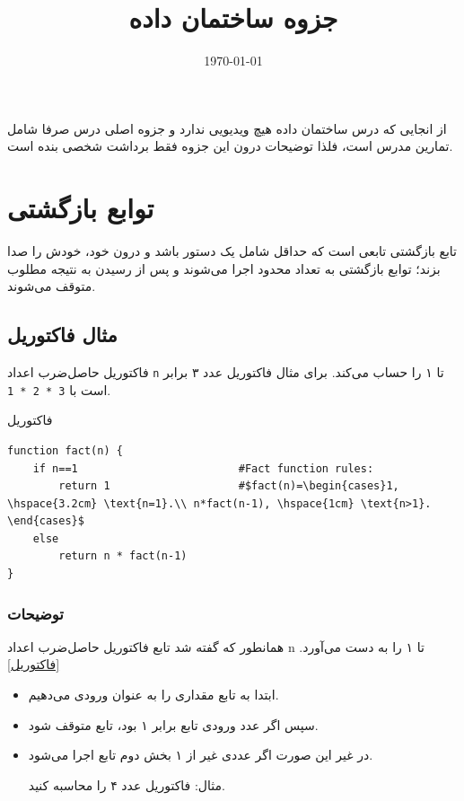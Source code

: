 \documentclass[a4paper]{article}
\author{\rl{مهدی صفریان}}
\date{\today}
\title{جزوه ساختمان داده}
\begin{document}
\maketitle
\tableofcontents

\begin{block}
از انجایی که درس ساختمان داده هیچ ویدیویی ندارد و جزوه اصلی درس صرفا شامل تمارین مدرس است، فلذا توضیحات درون این جزوه فقط برداشت شخصی بنده است.
\end{block}

\section{توابع بازگشتی}
\label{sec:org81ce03f}
تابع بازگشتی تابعی است که حداقل شامل یک دستور باشد و درون خود، خودش را صدا بزند؛ توابع بازگشتی به تعداد محدود اجرا می‌شوند و پس از رسیدن به نتیجه مطلوب متوقف می‌شوند.

\subsection{مثال فاکتوریل}
\label{sec:orged4ef4e}
فاکتوریل حاصل‌ضرب اعداد \texttt{n} تا ۱ را حساب می‌کند.
برای مثال فاکتوریل عدد ۳ برابر است با \texttt{3 * 2 * 1}.

\begin{listing}[H]
\caption{\label{فاکتوریل}فاکتوریل}
\end{listing}
\begin{verbatim}
function fact(n) {
    if n==1                         #Fact function rules:
        return 1                    #$fact(n)=\begin{cases}1, \hspace{3.2cm} \text{n=1}.\\ n*fact(n-1), \hspace{1cm} \text{n>1}. \end{cases}$
    else
        return n * fact(n-1)
}
\end{verbatim}



\subsubsection{توضیحات}
\label{sec:orgd402409}
همانطور که گفته شد تابع فاکتوریل حاصل‌ضرب اعداد n تا ۱ را به دست می‌آورد. \ref{فاکتوریل}

\begin{itemize}
\item ابتدا به تابع مقداری را به عنوان ورودی می‌دهیم.
\item سپس اگر عدد ورودی تابع برابر ۱ بود، تابع متوقف شود.
\item در غیر این صورت اگر عددی غیر از ۱ بخش دوم تابع اجرا می‌شود.

مثال: فاکتوریل عدد ۴ را محاسبه کنید.
\end{itemize}
\end{document}
